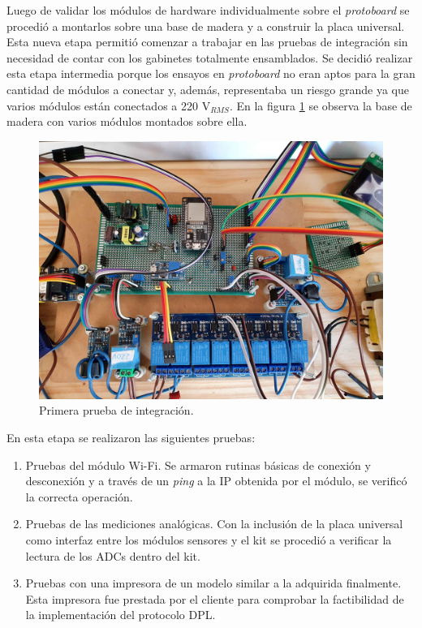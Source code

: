 Luego de validar los módulos de hardware individualmente sobre el \textit{protoboard} se procedió a montarlos sobre una base de madera y a construir la placa universal. Esta nueva etapa permitió comenzar a trabajar en las pruebas de integración sin necesidad de contar con los gabinetes totalmente ensamblados. Se decidió realizar esta etapa intermedia porque los ensayos en \textit{protoboard} no eran aptos para la gran cantidad de módulos a conectar y, además, representaba un riesgo grande ya que varios módulos están conectados a 220 V$_{RMS}$. En la figura \ref{fig:BaseMadera} se observa la base de madera con varios módulos montados sobre ella.

\begin{figure}[htpb]
	\centering
	\includegraphics[scale=0.09]{./Figures/madera.jpg}
	\caption{Primera prueba de integración.}
	\label{fig:BaseMadera}
\end{figure}

En esta etapa se realizaron las siguientes pruebas:
\begin{enumerate}
	\item Pruebas del módulo Wi-Fi. Se armaron rutinas básicas de conexión y desconexión y a través de un \textit{ping} a la IP obtenida por el módulo, se verificó la correcta operación.
	\item Pruebas de las mediciones analógicas. Con la inclusión de la placa universal como interfaz entre los módulos sensores y el kit se procedió a verificar la lectura de los ADCs dentro del kit.
	\item Pruebas con una impresora de un modelo similar a la adquirida finalmente. Esta impresora fue prestada por el cliente para comprobar la factibilidad de la implementación del protocolo DPL.
\end{enumerate}

